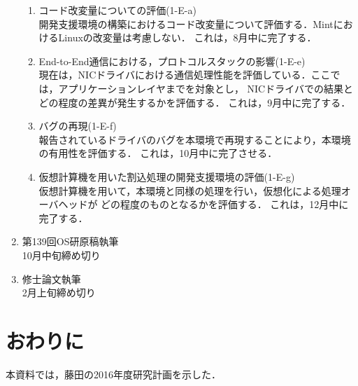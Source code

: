 \documentclass[12pt]{jsarticle}
\begin{document}
\begin{enumerate}
        \begin{enumerate}
            \item コード改変量についての評価(1-E-a)\\
                開発支援環境の構築におけるコード改変量について評価する．MintにおけるLinuxの改変量は考慮しない．
                これは，8月中に完了する．
            \item End-to-End通信における，プロトコルスタックの影響(1-E-e)\\
                現在は，NICドライバにおける通信処理性能を評価している．ここでは，アプリケーションレイヤまでを対象とし，
                NICドライバでの結果とどの程度の差異が発生するかを評価する．
                これは，9月中に完了する．
            \item バグの再現(1-E-f)\\
                報告されているドライバのバグを本環境で再現することにより，本環境の有用性を評価する．
                これは，10月中に完了させる．
            \item 仮想計算機を用いた割込処理の開発支援環境の評価(1-E-g)\\
                仮想計算機を用いて，本環境と同様の処理を行い，仮想化による処理オーバヘッドが
                どの程度のものとなるかを評価する．
                これは，12月中に完了する．
        \end{enumerate}
    \item 第139回OS研原稿執筆\\
        10月中旬締め切り
    \item 修士論文執筆\\
        2月上旬締め切り
\end{enumerate}

\section{おわりに}
本資料では，藤田の2016年度研究計画を示した．
\end{document}
